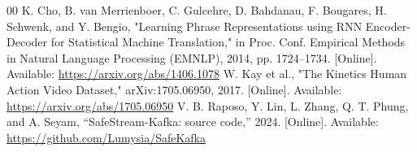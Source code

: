\documentclass[conference]{IEEEtran}
\begin{document}
\begin{thebibliography}{00}
 K. Cho, B. van Merrienboer, C. Gulcehre, D. Bahdanau, F. Bougares, H. Schwenk, and Y. Bengio, "Learning Phrase Representations using RNN Encoder-Decoder for Statistical Machine Translation," in Proc. Conf. Empirical Methods in Natural Language Processing (EMNLP), 2014, pp. 1724--1734. [Online]. Available: \url{https://arxiv.org/abs/1406.1078}
 W. Kay et al., "The Kinetics Human Action Video Dataset," arXiv:1705.06950, 2017. [Online]. Available: \url{https://arxiv.org/abs/1705.06950}
 V. B. Raposo, Y. Lin, L. Zhang, Q. T. Phung, and A. Seyam, ``SafeStream-Kafka: source code,'' 2024. [Online]. Available: \url{https://github.com/Lumysia/SafeKafka}
\end{thebibliography}
\end{document}
